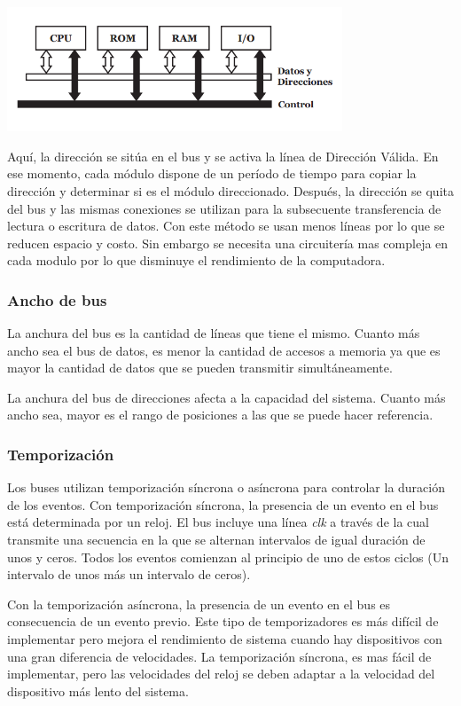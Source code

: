 \begin{center}
	\includegraphics[width=10cm, keepaspectratio=yes]{imagenes/bus_multiplexado.PNG}
\end{center}

Aquí, la dirección se sitúa en el bus y se activa la línea de Dirección Válida. En ese momento, cada módulo dispone de un período de tiempo para copiar la dirección y determinar si es el módulo direccionado. Después, la dirección se quita del bus y las mismas conexiones se utilizan para la subsecuente transferencia de lectura o escritura de datos. Con este método se usan menos líneas por lo que se reducen espacio y costo. Sin embargo se necesita una circuitería mas compleja en cada modulo por lo que disminuye el rendimiento de la computadora.

\subsubsection{Ancho de bus}
La anchura del bus es la cantidad de líneas que tiene el mismo. Cuanto más ancho sea el bus de datos, es menor la cantidad de accesos a memoria ya que es mayor la cantidad de datos que se pueden transmitir simultáneamente.

La anchura del bus de direcciones afecta a la capacidad del sistema. Cuanto más ancho sea, mayor es el rango de posiciones a las que se puede hacer referencia.

\subsubsection{Temporización}
Los buses utilizan temporización síncrona o asíncrona para controlar la duración de los eventos.
Con temporización síncrona, la presencia de un evento en el bus está determinada por un reloj. El bus incluye una línea \textit{clk} a través de la cual transmite una secuencia en la que se alternan intervalos de igual duración de unos y ceros. Todos los eventos comienzan al principio de uno de estos ciclos (Un intervalo de unos más un intervalo de ceros).

Con la temporización asíncrona, la presencia de un evento en el bus es consecuencia de un evento previo. Este tipo de temporizadores es más difícil de implementar pero mejora el rendimiento de sistema cuando hay dispositivos con una gran diferencia de velocidades. La temporización síncrona, es mas fácil de implementar, pero las velocidades del reloj se deben adaptar a la velocidad del dispositivo más lento del sistema.

